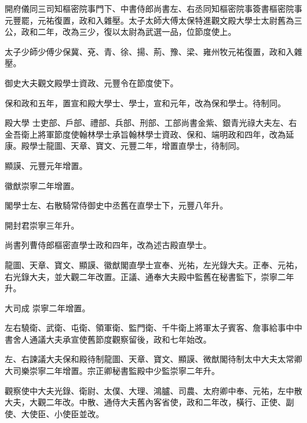 \begin{pinyinscope}
 開府儀同三司知樞密院事門下、中書侍郎尚書左、右丞同知樞密院事簽書樞密院事元豐罷，元祐復置，政和入雜壓。太子太師大傅太保特進觀文殿大學士太尉舊為三公，政和二年，改為三少，復以太尉為武選一品，位節度使上。



 太子少師少傅少保冀、兗、青、徐、揚、荊、豫、梁、雍州牧元祐復置，政和入雜壓。



 御史大夫觀文殿學士資政、元豐令在節度使下。



 保和政和五年，置宣和殿大學士、學士，宣和元年，改為保和學士。待制同。



 殿大學
 士吏部、戶部、禮部、兵部、刑部、工部尚書金紫、銀青光祿大夫左、右金吾衛上將軍節度使翰林學士承旨翰林學士資政、保和、端明政和四年，改為延康。殿學士龍圖、天章、寶文、元豐二年，增置直學士，待制同。



 顯謨、元豐元年增置。



 徽猷崇寧二年增置。



 閣學士左、右散騎常侍御史中丞舊在直學士下，元豐八年升。



 開封君崇寧三年升。



 尚書列曹侍郎樞密直學士政和四年，改為述古殿直學士。



 龍圖、天章、寶文、顯謨、徽猷閣直學士宣奉、光祐，左光錄大夫。正奉、元祐，右光錄大夫，並大觀二年改置。正議、通奉大夫殿中監舊在秘書監下，崇寧二年升。



 大司成
 崇寧二年增置。



 左右驍衛、武衛、屯衛、領軍衛、監門衛、千牛衛上將軍太子賓客、詹事給事中中書舍人通議大夫承宣使舊節度觀察留後，政和七年始改。



 左、右諫議大夫保和殿待制龍圖、天章、寶文、顯謨、微猷閣待制太中大夫太常卿大司樂崇寧二年增置。宗正卿秘書監殿中少監崇寧二年升。



 觀察使中大夫光錄、衛尉、太僕、大理、鴻臚、司農、太府卿中奉、元祐，左中散大夫，大觀二年改。中散、通侍大夫舊內客省使，政和二年改，橫行、正使、副使、大使臣、小使臣並改。




\end{pinyinscope}
